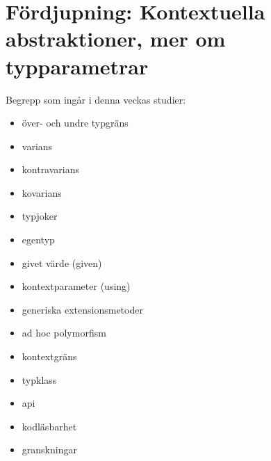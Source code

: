 \chapter{Fördjupning: Kontextuella abstraktioner, mer om typparametrar}\label{chapter:W11}
Begrepp som ingår i denna veckas studier:
\begin{itemize}[noitemsep,label={$\square$},leftmargin=*]
\item över- och undre typgräns
\item varians
\item kontravarians
\item kovarians
\item typjoker
\item egentyp
\item givet värde (given)
\item kontextparameter (using)
\item generiska extensionsmetoder
\item ad hoc polymorfism
\item kontextgräns
\item typklass
\item api
\item kodläsbarhet
\item granskningar\end{itemize}
